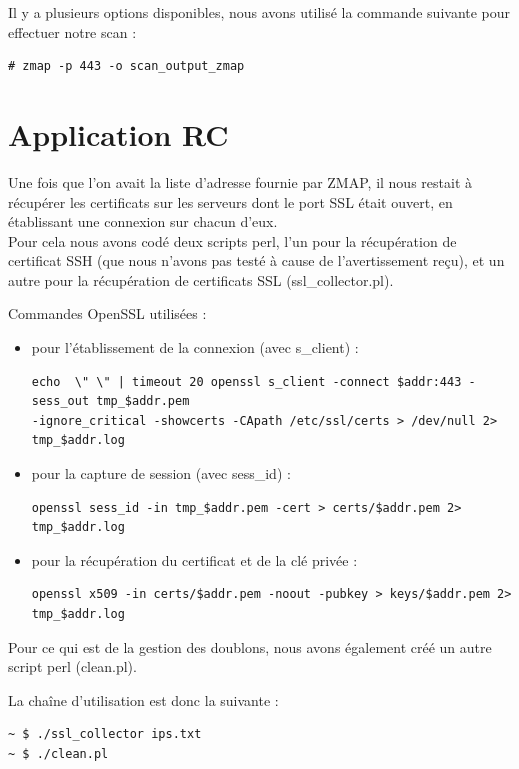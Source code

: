 Il y a plusieurs options disponibles, nous avons utilisé la commande suivante pour effectuer notre scan :
\begin{verbatim}
# zmap -p 443 -o scan_output_zmap
\end{verbatim}

\section{Application RC}

Une fois que l'on avait la liste d'adresse fournie par ZMAP, il nous restait à récupérer les certificats sur les serveurs dont le port SSL était ouvert, en établissant une connexion sur chacun d'eux.\\


Pour cela nous avons codé deux scripts perl, l'un pour la récupération de certificat SSH (que nous n'avons pas testé à cause de l'avertissement reçu), et un autre pour la récupération de certificats SSL (ssl\_collector.pl).

Commandes OpenSSL utilisées :
\begin{itemize}
\item pour l'établissement de la connexion (avec s\_client) :

\begin{verbatim}
echo  \" \" | timeout 20 openssl s_client -connect $addr:443 -sess_out tmp_$addr.pem 
-ignore_critical -showcerts -CApath /etc/ssl/certs > /dev/null 2> tmp_$addr.log
\end{verbatim}
\item  pour la capture de session (avec sess\_id) :
\begin{verbatim}
openssl sess_id -in tmp_$addr.pem -cert > certs/$addr.pem 2> tmp_$addr.log
\end{verbatim}
\item pour la récupération du certificat et de la clé privée :
\begin{verbatim}
openssl x509 -in certs/$addr.pem -noout -pubkey > keys/$addr.pem 2> tmp_$addr.log
\end{verbatim}
\end{itemize}

Pour ce qui est de la gestion des doublons, nous avons également créé un autre script perl (clean.pl).

La chaîne d'utilisation est donc la suivante :
\begin{verbatim}
~ $ ./ssl_collector ips.txt
~ $ ./clean.pl
\end{verbatim}

